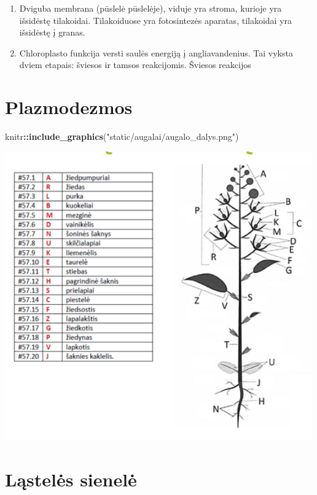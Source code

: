 \documentclass[]{book}
\newenvironment{Shaded}{\begin{snugshade}}{\end{snugshade}}
\newcommand{\KeywordTok}[1]{\textcolor[rgb]{0.13,0.29,0.53}{\textbf{#1}}}
\newcommand{\NormalTok}[1]{#1}
\newcommand{\OperatorTok}[1]{\textcolor[rgb]{0.81,0.36,0.00}{\textbf{#1}}}
\newcommand{\StringTok}[1]{\textcolor[rgb]{0.31,0.60,0.02}{#1}}
\providecommand{\tightlist}{%
  \setlength{\itemsep}{0pt}\setlength{\parskip}{0pt}}
\begin{document}
\begin{enumerate}
\def\labelenumi{\arabic{enumi}.}
\tightlist
\item
  Dviguba membrana (pūslelė pūslelėje), viduje yra stroma, kurioje yra išsidėstę tilakoidai. Tilakoiduose yra fotosintezės aparatas, tilakoidai yra išsidėstę į granas.
\item
  Chloroplasto funkcija versti saulės energiją į angliavandenius. Tai vyksta dviem etapais: šviesos ir tamsos reakcijomis. Šviesos reakcijos
\end{enumerate}

\hypertarget{plazmodezmos}{%
\section{Plazmodezmos}\label{plazmodezmos}}

\begin{Shaded}
\begin{Highlighting}[]
\NormalTok{knitr}\OperatorTok{::}\KeywordTok{include_graphics}\NormalTok{(}\StringTok{"static/augalai/augalo_dalys.png"}\NormalTok{)}
\end{Highlighting}
\end{Shaded}

\includegraphics[width=500px]{static/augalai/augalo_dalys}

\hypertarget{lasteles-sienele}{%
\section{Ląstelės sienelė}\label{lasteles-sienele}}
\end{document}
